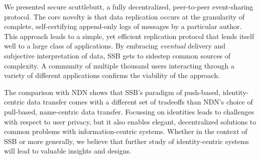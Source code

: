 \documentclass[9pt,sigconf]{acmart}
\begin{document}
We presented secure scuttlebutt, a fully decentralized, peer-to-peer event-sharing protocol. The core novelty is that data replication occurs at the granularity of complete, self-certifying append-only logs of messages by a particular author. This approach leads to a simple, yet efficient replication protocol that lends itself well to a large class of applications. By embracing \textit{eventual} delivery and subjective interpretation of data, SSB gets to sidestep common sources of complexity. A community of multiple thousand users interacting through a variety of different applications confirms the viability of the approach.

The comparison with NDN shows that SSB's paradigm of push-based, identity-centric data transfer comes with a different set of tradeoffs than NDN's choice of pull-based, name-centric data transfer. Focussing on identities leads to challenges with respect to user privacy, but it also enables elegant, decentralized solutions to common problems with information-centric systems. Whether in the context of SSB or more generally, we believe that further study of identity-centric systems will lead to valuable insights and designs.

\newpage
\clearpage
\newpage

\balance

\end{document}
